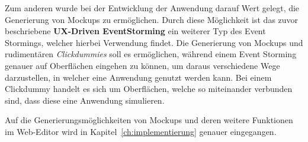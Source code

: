 Zum anderen wurde bei der Entwicklung der Anwendung darauf Wert gelegt, die Generierung von Mockups zu ermöglichen.
Durch diese Möglichkeit ist das zuvor beschriebene \textbf{UX-Driven EventStorming} ein weiterer Typ des Event Stormings, welcher hierbei Verwendung findet.
Die Generierung von Mockups und rudimentären \textit{Clickdummies} soll es ermöglichen, während einem Event Storming genauer auf Oberflächen eingehen zu können,
um daraus verschiedene Wege darzustellen, in welcher eine Anwendung genutzt werden kann.
Bei einem Clickdummy handelt es sich um Oberflächen, welche so miteinander verbunden sind, dass diese eine Anwendung simulieren.

Auf die Generierungsmöglichkeiten von Mockups und deren weitere Funktionen im Web-Editor wird in Kapitel~\ref{ch:implementierung} genauer eingegangen.

